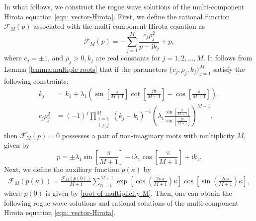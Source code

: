 \documentclass[preprint,3p,10pt]{elsarticle}
\theoremstyle{definition}
\begin{document}
In what follows, we construct the rogue wave solutions of the multi-component Hirota equation \eqref{eqn: vector-Hirota}. First, we define the rational function $\mathcal{F}_M(p)$ associated with the multi-component Hirota equation as
\begin{equation}\label{eqn:definition of F(p)}
\mathcal{F}_M(p) = -\sum_{j=1}^M \frac{c_j \rho_j^2}{p-\mathrm{i} k_j} + p, 
\end{equation}
where $c_j = \pm 1$, and $\rho_j > 0, k_j$ are real constants for $j=1,2,\dots,M$. It follows from Lemma \ref{lemma:multiple roots} that if the parameters $\{c_j, \rho_j, k_j\}_{j=1}^M$ satisfy the following constraints:
\begin{equation}\label{eqn:constraints of multiple zeros}
\begin{aligned}
 k_j &= k_1 + \lambda_1 \left( \sin\left[\frac{\pi}{M+1}\right] \cot\left[\frac{j \pi}{M+1}\right] - \cos\left[\frac{\pi}{M+1}\right]\right), \\
 c_j \rho_j^2 &= (-1)^{j} \prod_{\substack{i=1 \\ i \not=j}}^M (k_j-k_i)^{-1}  \left(\lambda_1 \frac{\sin\left[  \frac{\pi}{M+1}\right] }{\sin\left[\frac{j\pi}{M+1}\right]} \right)^{M+1},
 \end{aligned}
\end{equation}
then $\mathcal{F}_M^{\prime}(p)=0$ possesses a pair of non-imaginary roots with multiplicity $M$, given by
\begin{equation} \label{root of multiplicity M}
 p = \pm \lambda_1 \sin\left[\frac{\pi}{M+1}\right] - \mathrm{i} \lambda_1 \cos\left[\frac{\pi}{M+1}\right] + \mathrm{i} k_1.
\end{equation}
Next, we define the auxiliary function $p(\kappa)$ by
\begin{equation}\label{eqn:definition of p(kappa)}
\begin{aligned}
 \mathcal{F}_M(p(\kappa)) 
= \frac{\mathcal{F}_M(p(0))}{M+1} \sum_{n=1}^{M+1} \exp\left[\cos\left(\frac{2 n \pi}{M+1}\right) \kappa\right] \cos\left[\sin \left(\frac{2 n \pi}{M+1}\right)\kappa\right],
\end{aligned}
\end{equation}
where $p(0)$ is given by \eqref{root of multiplicity M}.
Then, one can obtain the following rogue wave solutions and rational solutions of the multi-component Hirota equation \eqref{eqn: vector-Hirota}.
\end{document}
